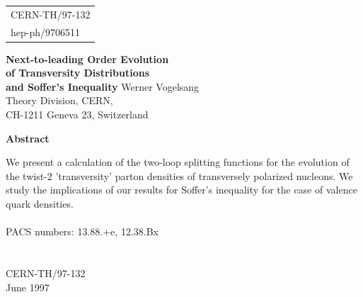 \textheight 23.0cm \textwidth 16cm
\oddsidemargin 0cm \evensidemargin 0cm
\topmargin 0cm

\setlength{\baselineskip}{0.75cm}
\setlength{\parskip}{0.45cm}
\begin{titlepage}
\begin{flushright}
\begin{tabular}{l}
CERN-TH/97-132 \\
hep-ph/9706511
\end{tabular}
\end{flushright}
\vspace*{1.2cm}
\begin{center}
\Large{
{\bf Next-to-leading Order Evolution\\} 
\vspace*{0.5cm}
{\bf of Transversity Distributions\\}
\vspace*{0.5cm}
{\bf and Soffer's Inequality}}
\vskip 3cm
{\large Werner Vogelsang}  \\
\vspace*{1cm}
\normalsize
Theory Division, CERN,\\
CH-1211 Geneva 23, Switzerland \\
\end{center}
\vskip 1.8cm
\begin{center}
{\bf Abstract} \\
\end{center}
We present a calculation of the two-loop splitting functions for the 
evolution of the twist-2 'transversity' parton densities of transversely
polarized nucleons. We study the implications of our results for 
Soffer's inequality for the case of valence quark densities. \\ \\  
PACS numbers: 13.88.+e, 12.38.Bx \\ \\ \\
CERN-TH/97-132 \\
June 1997 
\end{titlepage}
%
